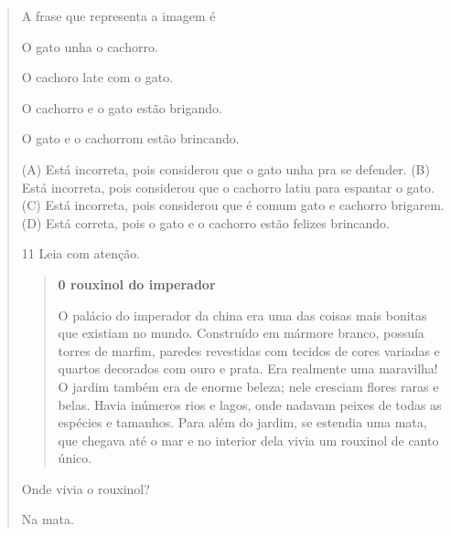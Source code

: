 \begin{verse}

A frase que representa a imagem é

\begin{escolha}
\item O gato unha o cachorro.

\item O cachoro late com o gato.

\item O cachorro e o gato estão brigando.

\item O gato e o cachorrom estão brincando.
\end{escolha}


(A) Está incorreta, pois considerou que o gato unha pra se defender.
(B) Está incorreta, pois considerou que o cachorro latiu para espantar o gato.
(C) Está incorreta, pois considerou que é comum gato e cachorro brigarem.
(D) Está correta, pois o gato e o cachorro estão felizes brincando.

\num{11} Leia com atenção.

\begin{quote}
\textbf{0 rouxinol do imperador}

O palácio do imperador da china era uma das coisas mais
bonitas que existiam no mundo. Construído em mármore
branco, possuía torres de marfim, paredes revestidas com
tecidos de cores variadas e quartos decorados com ouro e
prata. Era realmente uma maravilha!
O jardim também era de enorme beleza; nele cresciam
flores raras e belas. Havia inúmeros rios e lagos, onde
nadavam peixes de todas as espécies e tamanhos.
Para além do jardim, se estendia uma mata, que
chegava até o mar e no interior dela vivia um rouxinol de
canto único.
\end{quote}


Onde vivia o rouxinol?

\begin{escolha}
\item Na mata.


\end{escolha}
\end{verse}
